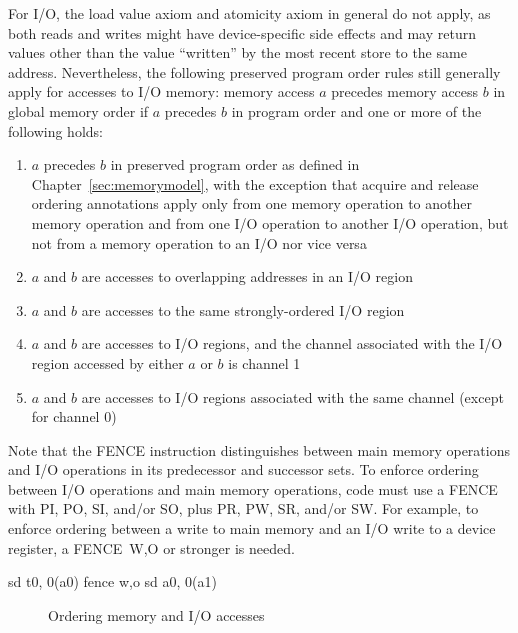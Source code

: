 For I/O, the load value axiom and atomicity axiom in general do not apply, as both reads and writes might have device-specific side effects and may return values other than the value ``written'' by the most recent store to the same address.
Nevertheless, the following preserved program order rules still generally apply for accesses to I/O memory:
memory access $a$ precedes memory access $b$ in global memory order if $a$ precedes $b$ in program order and one or more of the following holds:
\begin{enumerate}
  \item $a$ precedes $b$ in preserved program order as defined in Chapter~\ref{sec:memorymodel}, with the exception that acquire and release ordering annotations apply only from one memory operation to another memory operation and from one I/O operation to another I/O operation, but not from a memory operation to an I/O nor vice versa
  \item $a$ and $b$ are accesses to overlapping addresses in an I/O region
  \item $a$ and $b$ are accesses to the same strongly-ordered I/O region
  \item $a$ and $b$ are accesses to I/O regions, and the channel associated with the I/O region accessed by either $a$ or $b$ is channel 1
  \item $a$ and $b$ are accesses to I/O regions associated with the same channel (except for channel 0)
\end{enumerate}

Note that the FENCE instruction distinguishes between main memory operations and I/O operations in its predecessor and successor sets.
To enforce ordering between I/O operations and main memory operations, code must use a FENCE with PI, PO, SI, and/or SO, plus PR, PW, SR, and/or SW.
For example, to enforce ordering between a write to main memory and an I/O write to a device register, a FENCE~W,O or stronger is needed.

\begin{verbbox}
  sd t0, 0(a0)
  fence w,o
  sd a0, 0(a1)
\end{verbbox}
\begin{figure}[h!]
  \centering\small
  \theverbbox
  \caption{Ordering memory and I/O accesses}
  \label{fig:litmus:wo}
\end{figure}


